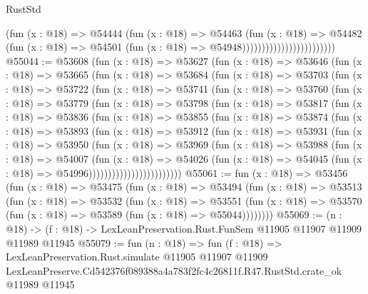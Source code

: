 \begin{lexlean}{RustStd}
\begin{coremodule}
                                          (fun (x : @18) =>
                                          @54444
                                            (fun (x : @18) =>
                                            @54463
                                              (fun (x : @18) =>
                                              @54482
                                                (fun (x : @18) =>
                                                @54501
                                                  (fun (x : @18) => @54948))))))))))))))))))))))))
@55044 := @53608
    (fun (x : @18) =>
    @53627
      (fun (x : @18) =>
      @53646
        (fun (x : @18) =>
        @53665
          (fun (x : @18) =>
          @53684
            (fun (x : @18) =>
            @53703
              (fun (x : @18) =>
              @53722
                (fun (x : @18) =>
                @53741
                  (fun (x : @18) =>
                  @53760
                    (fun (x : @18) =>
                    @53779
                      (fun (x : @18) =>
                      @53798
                        (fun (x : @18) =>
                        @53817
                          (fun (x : @18) =>
                          @53836
                            (fun (x : @18) =>
                            @53855
                              (fun (x : @18) =>
                              @53874
                                (fun (x : @18) =>
                                @53893
                                  (fun (x : @18) =>
                                  @53912
                                    (fun (x : @18) =>
                                    @53931
                                      (fun (x : @18) =>
                                      @53950
                                        (fun (x : @18) =>
                                        @53969
                                          (fun (x : @18) =>
                                          @53988
                                            (fun (x : @18) =>
                                            @54007
                                              (fun (x : @18) =>
                                              @54026
                                                (fun (x : @18) =>
                                                @54045
                                                  (fun (x : @18) => @54996))))))))))))))))))))))))
@55061 := fun (x : @18) =>
  @53456
    (fun (x : @18) =>
    @53475
      (fun (x : @18) =>
      @53494
        (fun (x : @18) =>
        @53513
          (fun (x : @18) =>
          @53532
            (fun (x : @18) =>
            @53551
              (fun (x : @18) => @53570 (fun (x : @18) => @53589 (fun (x : @18) => @55044))))))))
@55069 := (n : @18) ->
  (f : @18) -> LexLeanPreservation.Rust.FunSem @11905 @11907 @11909 @11989 @11945
@55079 := fun (n : @18) =>
  fun (f : @18) =>
  LexLeanPreservation.Rust.simulate
    @11905
    @11907
    @11909
    LexLeanPreserve.Cd542376f089388a4a783f2fc4c26811f.R47.RustStd.crate_ok
    @11989
    @11945
\end{coremodule}
\end{lexlean}
